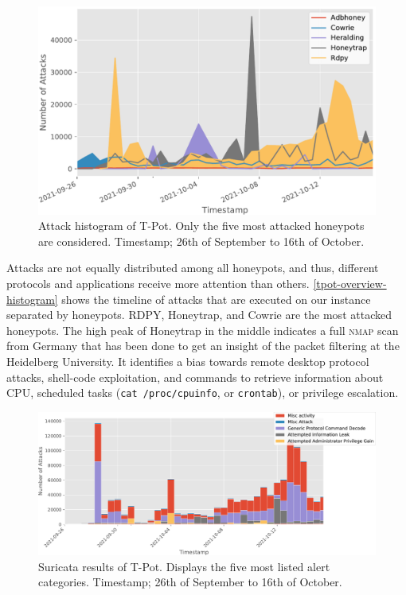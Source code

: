 \begin{figure}[ht]
    \centering
    \includegraphics[width=\textwidth]{figures/tpot-attacks-histogram.pdf}
    \caption[Attack histogram of T-Pot]{
        Attack histogram of T-Pot.
        Only the five most attacked honeypots are considered.
        Timestamp; 26th of September to 16th of October.
    }
    \label{tpot-overview-histogram}
\end{figure}

Attacks are not equally distributed among all honeypots, and thus, different protocols and applications receive more attention than others.
\autoref{tpot-overview-histogram} shows the timeline of attacks that are executed on our instance separated by honeypots.
RDPY, Honeytrap, and Cowrie are the most attacked honeypots.
The high peak of Honeytrap in the middle indicates a full \textsc{nmap} scan from Germany that has been done to get an insight of the packet filtering at the Heidelberg University.
It identifies a bias towards remote desktop protocol attacks, shell-code exploitation, and commands to retrieve information about CPU, scheduled tasks (\verb|cat /proc/cpuinfo|, or \verb|crontab|), or privilege escalation.

\begin{figure}[ht]
    \centering
    \includegraphics[width=\textwidth]{figures/tpot-suricata-alerts.pdf}
    \caption[Suricata results of T-Pot]{
        Suricata results of T-Pot.
        Displays the five most listed alert categories.
        Timestamp; 26th of September to 16th of October.
    }
    \label{fig:suricata-results}
\end{figure}

